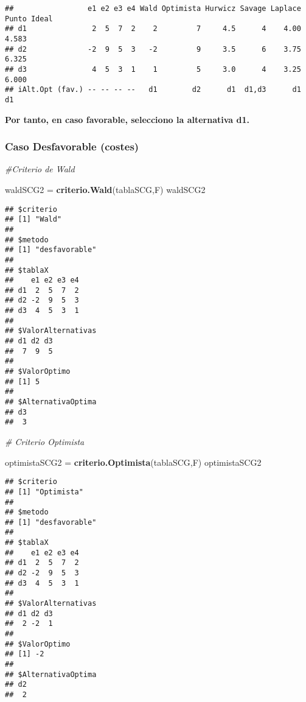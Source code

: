 \documentclass[
]{article}
\newenvironment{Shaded}{\begin{snugshade}}{\end{snugshade}}
\newcommand{\CommentTok}[1]{\textcolor[rgb]{0.56,0.35,0.01}{\textit{#1}}}
\newcommand{\FunctionTok}[1]{\textcolor[rgb]{0.13,0.29,0.53}{\textbf{#1}}}
\newcommand{\NormalTok}[1]{#1}
\newcommand{\OtherTok}[1]{\textcolor[rgb]{0.56,0.35,0.01}{#1}}
\begin{document}
\begin{verbatim}
##                 e1 e2 e3 e4 Wald Optimista Hurwicz Savage Laplace Punto Ideal
## d1               2  5  7  2    2         7     4.5      4    4.00       4.583
## d2              -2  9  5  3   -2         9     3.5      6    3.75       6.325
## d3               4  5  3  1    1         5     3.0      4    3.25       6.000
## iAlt.Opt (fav.) -- -- -- --   d1        d2      d1  d1,d3      d1          d1
\end{verbatim}

\textbf{Por tanto, en caso favorable, selecciono la alternativa d1.}

\subsubsection{Caso Desfavorable
(costes)}\label{caso-desfavorable-costes}

\begin{Shaded}
\begin{Highlighting}[]
\CommentTok{\#Criterio de Wald}

\NormalTok{waldSCG2 }\OtherTok{=} \FunctionTok{criterio.Wald}\NormalTok{(tablaSCG,F)}
\NormalTok{waldSCG2}
\end{Highlighting}
\end{Shaded}

\begin{verbatim}
## $criterio
## [1] "Wald"
## 
## $metodo
## [1] "desfavorable"
## 
## $tablaX
##    e1 e2 e3 e4
## d1  2  5  7  2
## d2 -2  9  5  3
## d3  4  5  3  1
## 
## $ValorAlternativas
## d1 d2 d3 
##  7  9  5 
## 
## $ValorOptimo
## [1] 5
## 
## $AlternativaOptima
## d3 
##  3
\end{verbatim}

\begin{Shaded}
\begin{Highlighting}[]
\CommentTok{\# Criterio Optimista}

\NormalTok{optimistaSCG2 }\OtherTok{=} \FunctionTok{criterio.Optimista}\NormalTok{(tablaSCG,F)}
\NormalTok{optimistaSCG2}
\end{Highlighting}
\end{Shaded}

\begin{verbatim}
## $criterio
## [1] "Optimista"
## 
## $metodo
## [1] "desfavorable"
## 
## $tablaX
##    e1 e2 e3 e4
## d1  2  5  7  2
## d2 -2  9  5  3
## d3  4  5  3  1
## 
## $ValorAlternativas
## d1 d2 d3 
##  2 -2  1 
## 
## $ValorOptimo
## [1] -2
## 
## $AlternativaOptima
## d2 
##  2
\end{verbatim}
\end{document}
